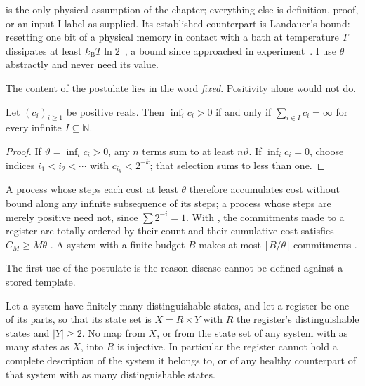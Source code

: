  is the only physical assumption of the chapter;
everything else is definition, proof, or an input I label as supplied. Its
established counterpart is Landauer's bound: resetting one bit of a physical
memory in contact with a bath at temperature $T$ dissipates at least
$k_{\mathrm{B}}T\ln 2$~\citep{Landauer1961,bennett1982}, a bound since
approached in experiment~\citep{berut2012}. \lnkS{} I use $\theta$ abstractly
and never need its value.

The content of the postulate lies in the word \emph{fixed}. Positivity
alone would not do.

\begin{theorem}
\label{c1:thm-selection}
\lnkD{} Let $(c_i)_{i\ge1}$ be positive reals. Then $\inf_i c_i>0$ if and
only if $\sum_{i\in I}c_i=\infty$ for every infinite $I\subseteq\mathbb N$.
\end{theorem}

\begin{proof}
If $\vartheta=\inf_i c_i>0$, any $n$ terms sum to at least $n\vartheta$. If
$\inf_i c_i=0$, choose indices $i_1<i_2<\cdots$ with $c_{i_k}<2^{-k}$; that
selection sums to less than one.
\end{proof}

A process whose steps each cost at least $\theta$ therefore accumulates
cost without bound along any infinite subsequence of its steps; a process
whose steps are merely positive need not, since $\sum 2^{-i}=1$. With
, the commitments made to a register are totally
ordered by their count and their cumulative cost satisfies $C_M\ge M\theta$
\lnkD. A system with a finite budget $B$ makes at most $\lfloor B/\theta
\rfloor$ commitments \lnkD.

The first use of the postulate is the reason disease cannot be defined
against a stored template.

\begin{proposition}
\label{c1:prop-template}
\lnkD{} Let a system have finitely many distinguishable states, and let a
register be one of its parts, so that its state set is $X=R\times Y$ with
$R$ the register's distinguishable states and $|Y|\ge2$. No map from $X$, or
from the state set of any system with as many states as $X$, into $R$ is
injective. In particular the register cannot hold a complete description of
the system it belongs to, or of any healthy counterpart of that system with
as many distinguishable states.
\end{proposition}

